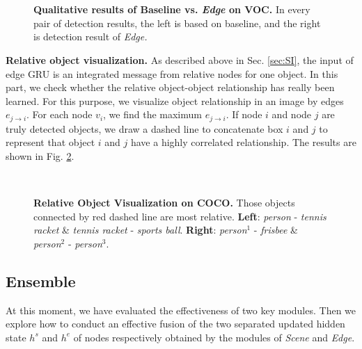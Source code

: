 \documentclass[10pt,twocolumn,letterpaper]{article}
\begin{document}
{\begin{figure}[t]
\vspace{-1ex}
\centering
{} 
 \hspace{-1ex}
 \\
 \vspace{-2ex}
   \\ 
\caption{{\bf Qualitative results of Baseline vs. {\em Edge} on VOC.} In every pair of detection results, the left is based on baseline, and the right is detection result of {\em Edge.}}
\label{fig:edgeRes}
\vspace{-2ex}
\end{figure}

{\bf Relative object visualization.}
As described above in Sec. \ref{sec:SI}, the input of edge GRU is an integrated message from relative nodes for one object. In this part, we check whether the relative object-object relationship has really been learned. For this purpose, we visualize object relationship in an image by edges $e_{j \to i}$. For each node $v_i$, we find the maximum $e_{j \to i}$. If node $i$ and node $j$ are truly detected objects, we draw a dashed line to concatenate box $i$ and $j$ to represent that object $i$ and $j$ have a highly correlated relationship. The results are shown in Fig. \ref{fig:visRela}. 

\begin{figure}[t]
\centering
{} 
\\
\caption{{\bf Relative Object Visualization on COCO.} Those objects connected by red dashed line are most relative. {\bf Left}: {\em person} - {\em tennis racket} \& {\em tennis racket} - {\em sports ball}. {\bf Right}: {\em person$^1$} - {\em frisbee} \& {\em person$^2$} - {\em person$^3$}.}
\label{fig:visRela}
\vspace{-1ex}
\end{figure}

\subsection{Ensemble}
\label{sec:way}
At this moment, we have evaluated the effectiveness of two key modules. Then we explore how to conduct an effective fusion of the two separated updated hidden state $h^s$ and $h^e$ of nodes respectively obtained by the modules of {\em Scene} and {\em Edge}.

}
\end{document}
